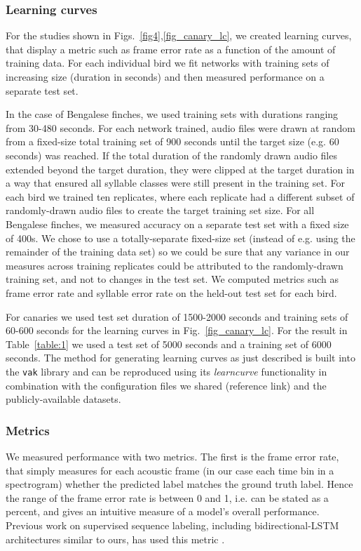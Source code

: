 \documentclass[10pt,letterpaper]{article}
\begin{document}
\subsubsection*{Learning curves}
\label{methods:learning curves}
For the studies shown in Figs.~\ref{fig4},\ref{fig_canary_lc}, we created learning curves,
that display a metric such as frame error rate as a function of the amount of training data.
For each individual bird we fit networks with training sets of increasing size (duration in seconds) 
and then measured performance on a separate test set.

In the case of Bengalese finches, we used training sets with durations ranging from 30-480 seconds. 
For each network trained, audio files were drawn at random from a fixed-size total training set of 900 seconds 
until the target size (e.g. 60 seconds) was reached. If the total duration of the randomly drawn audio files 
extended beyond the target duration, they were clipped at the target duration 
in a way that ensured all syllable classes were still present in the training set.
For each bird we trained ten replicates, where each 
replicate had a different subset of randomly-drawn audio files to create the target training set size.
For all Bengalese finches, we measured accuracy on a separate test set with a fixed size of 400s. We chose 
to use a totally-separate fixed-size set (instead of e.g. using the remainder of the training data set) so 
we could be sure that any variance in our measures across training replicates could be attributed to 
the randomly-drawn training set, and not to changes in the test set.
We computed metrics such as frame error rate and syllable error rate on the held-out test set for each bird.

For canaries we used test set duration of 1500-2000 seconds and training sets of 60-600 seconds for the learning curves in Fig.~\ref{fig_canary_lc}. 
For the result in Table~\ref{table:1} we used a test set of 5000 seconds and a training set of 6000 seconds. 
The method for generating learning curves as just described is built into the \texttt{vak} library and 
can be reproduced using its \textit{learncurve} functionality in combination with the configuration files 
we shared (reference link) and the publicly-available datasets.

\subsubsection*{Metrics}
We measured performance with two metrics. The first is the frame error rate, that simply measures for each acoustic frame 
(in our case each time bin in a spectrogram) whether the predicted label matches the ground truth 
label. Hence the range of the frame error rate is between 0 and 1, i.e. can be stated as a percent, and 
gives an intuitive measure of a model's overall performance. Previous work on supervised sequence labeling, including 
bidirectional-LSTM architectures similar to ours, has used this metric \cite{graves_supervised_2012,graves_framewise_2005}.  
\end{document}
